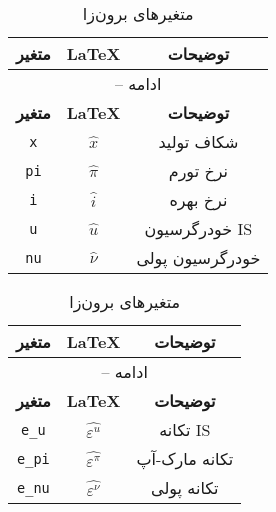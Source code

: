 \begin{center}
\begin{longtable}{ccc}
\caption{متغیرهای برون‌زا}\\%
\hline%
\multicolumn{1}{c}{\textbf{متغیر}} &
\multicolumn{1}{c}{\textbf{\LaTeX}} &
\multicolumn{1}{c}{\textbf{توضیحات}}\\%
\hline\hline%
\endfirsthead
\multicolumn{3}{c}{{\tablename} \thetable{} -- ادامه}\\%
\hline%
\multicolumn{1}{c}{\textbf{متغیر}} &
\multicolumn{1}{c}{\textbf{\LaTeX}} &
\multicolumn{1}{c}{\textbf{توضیحات}}\\%
\hline\hline%
\endhead
\texttt{x} & $\hat{x}$ & شکاف تولید\\
\texttt{pi} & $\hat{\pi}$ & نرخ تورم\\
\texttt{i} & $\hat{i}$ & نرخ بهره\\
\texttt{u} & $\hat{u}$ & خودرگرسیون IS\\
\texttt{nu} & $\hat{\nu}$ & خودرگرسیون پولی\\
\hline%
\end{longtable}
\end{center}
\begin{center}
\begin{longtable}{ccc}
\caption{متغیرهای برون‌زا}\\%
\hline%
\multicolumn{1}{c}{\textbf{متغیر}} &
\multicolumn{1}{c}{\textbf{\LaTeX}} &
\multicolumn{1}{c}{\textbf{توضیحات}}\\%
\hline\hline%
\endfirsthead
\multicolumn{3}{c}{{\tablename} \thetable{} -- ادامه}\\%
\hline%
\multicolumn{1}{c}{\textbf{متغیر}} &
\multicolumn{1}{c}{\textbf{\LaTeX}} &
\multicolumn{1}{c}{\textbf{توضیحات}}\\%
\hline\hline%
\endhead
\texttt{e\_u} & $\hat{\varepsilon^{u}}$ & تکانه IS\\
\texttt{e\_pi} & $\hat{\varepsilon^{\pi}}$ & تکانه مارک-آپ\\
\texttt{e\_nu} & $\hat{\varepsilon^{\nu}}$ & تکانه پولی\\
\hline%
\end{longtable}
\end{center}
